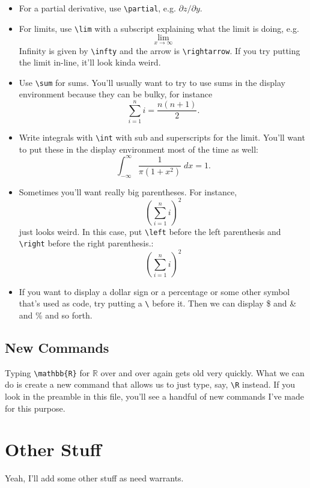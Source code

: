 \documentclass[12pt]{article}
\newcommand{\R}{\mathbb{R}}
\begin{document}
\begin{itemize}
		\item For a partial derivative, use \verb|\partial|, e.g. $\partial z/\partial y$. 
		
		\item For limits, use \verb|\lim| with a subscript explaining what the limit is 
		doing, e.g.
				\[ \lim_{x \rightarrow \infty}  \]
		Infinity is given by \verb|\infty| and  the arrow is \verb|\rightarrow|. If you 
		try putting the limit in-line, it'll look kinda weird. 
		
		\item Use \verb|\sum| for sums. You'll usually want to try to use sums in the 
		display environment because they can be bulky, for instance
			\[\sum_{i=1}^n i = \frac{n(n+1)}{2}.\]
			
		\item Write integrals with \verb|\int| with sub and superscripts for the limit. 
		You'll want to put these in the display environment most of the time as well:
			\[ \int_{-\infty}^{\infty} \frac{1}{\pi(1+x^2)} \; dx = 1 .\]
			
		\item Sometimes you'll want really big parentheses. For instance,
				\[ ( \sum_{i=1}^n i)^2	\]
			just looks weird. In this case, put \verb|\left| before the left parenthesis 
			and \verb|\right| before the right parenthesis.:
				\[ \left( \sum_{i=1}^n i \right)^2	\]
				
		\item If you want to display a dollar sign or a percentage or some other symbol 
		that's used as code, try putting a \verb|\| before it. Then we can display \$ and 
		\& and \% and so forth.
	\end{itemize}

	
\subsection{New Commands}
	
	Typing \verb|\mathbb{R}| for $\mathbb{R}$ over and over again gets old very quickly. 
	What we can do is create a new command that allows us to just type, say, \verb|\R| 
	instead. If you look in the preamble in this file, you'll see a handful of new commands
	I've made for this purpose. 
	
	
	
	\section{Other Stuff}
	
	Yeah, I'll add some other stuff as need warrants. 
 
	
\end{document}
